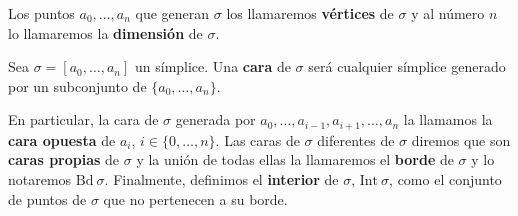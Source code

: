 Los puntos $a_0, \dots, a_n$ que generan $\sigma$ los llamaremos \textbf{vértices} de $\sigma$
y al número $n$ lo llamaremos la \textbf{dimensión} de $\sigma$.

\begin{definicion}
	Sea $\sigma=[a_0, \dots, a_n]$ un símplice. Una \textbf{cara} de $\sigma$ será cualquier
	símplice generado por un subconjunto de $\{a_0, \dots, a_n\}$.
\end{definicion}
En particular, la cara de $\sigma$ generada por $a_0, \dots, a_{i-1}, a_{i+1}, \dots, a_n$ la 
llamamos la \textbf{cara opuesta} de $a_i$, $i \in \{0, \dots, n\}$. Las caras de $\sigma$ 
diferentes de $\sigma$ diremos que son \textbf{caras propias} de $\sigma$ y la unión de todas ellas la 
llamaremos el \textbf{borde} de $\sigma$ y lo notaremos $\text{Bd}\ \sigma$. Finalmente, definimos el \textbf{interior} de $\sigma$, $\text{Int}\ \sigma$, como el conjunto de puntos de $\sigma$ que no pertenecen 
a su borde.

